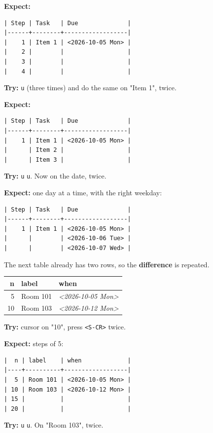 \textbf{Expect:}
\begin{verbatim}
| Step | Task   | Due              |
|------+--------+------------------|
|    1 | Item 1 | <2026-10-05 Mon> |
|    2 |        |                  |
|    3 |        |                  |
|    4 |        |                  |
\end{verbatim}

\textbf{Try:} \texttt{u} (three times) and do the same on "Item 1", twice.

\textbf{Expect:}
\begin{verbatim}
| Step | Task   | Due              |
|------+--------+------------------|
|    1 | Item 1 | <2026-10-05 Mon> |
|      | Item 2 |                  |
|      | Item 3 |                  |
\end{verbatim}

\textbf{Try:} \texttt{u} \texttt{u}. Now on the date, twice.

\textbf{Expect:} one day at a time, with the right weekday:
\begin{verbatim}
| Step | Task   | Due              |
|------+--------+------------------|
|    1 | Item 1 | <2026-10-05 Mon> |
|      |        | <2026-10-06 Tue> |
|      |        | <2026-10-07 Wed> |
\end{verbatim}

The next table already has two rows, so the \textbf{difference} is repeated.

\begin{table}[htbp]
\label{tab:orgf5f9677}
\centering
\begin{tabular}{rll}
n & label & when\\
\hline
5 & Room 101 & \textit{<2026-10-05 Mon>}\\
10 & Room 103 & \textit{<2026-10-12 Mon>}\\
\end{tabular}
\end{table}

\textbf{Try:} cursor on "10", press \texttt{<S-CR>} twice.

\textbf{Expect:} steps of 5:
\begin{verbatim}
|  n | label    | when             |
|----+----------+------------------|
|  5 | Room 101 | <2026-10-05 Mon> |
| 10 | Room 103 | <2026-10-12 Mon> |
| 15 |          |                  |
| 20 |          |                  |
\end{verbatim}

\textbf{Try:} \texttt{u} \texttt{u}. On "Room 103", twice.

